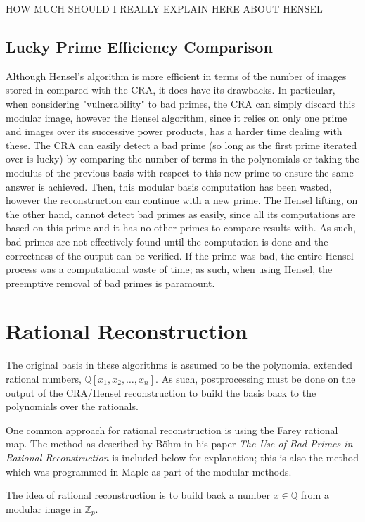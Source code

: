 \documentclass[letterpaper,12pt,titlepage,oneside,final]{book}
\begin{document}
HOW MUCH SHOULD I REALLY EXPLAIN HERE ABOUT HENSEL  

\subsection{Lucky Prime Efficiency Comparison}

Although Hensel's algorithm is more efficient in terms of the number of images stored in compared with the CRA, it does have its drawbacks.  In particular, when considering "vulnerability" to bad primes, the CRA can simply discard this modular image, however the Hensel algorithm, since it relies on only one prime and images over its successive power products, has a harder time dealing with these.  The CRA can easily detect a bad prime (so long as the first prime iterated over is lucky) by comparing the number of terms in the polynomials or taking the modulus of the previous basis with respect to this new prime to ensure the same answer is achieved.  Then, this modular basis computation has been wasted, however the reconstruction can continue with a new prime.  The Hensel lifting, on the other hand, cannot detect bad primes as easily, since all its computations are based on this prime and it has no other primes to compare results with.  As such, bad primes are not effectively found until the computation is done and the correctness of the output can be verified.  If the prime was bad, the entire Hensel process was a computational waste of time; as such, when using Hensel, the preemptive removal of bad primes is paramount.

\section{Rational Reconstruction}

The original basis in these algorithms is assumed to be the polynomial extended rational numbers, ${\mathbb{Q}[x_1, x_2, \ldots, x_n]}$.  As such, postprocessing must be done on the output of the CRA/Hensel reconstruction to build the basis back to the polynomials over the rationals.  

One common approach for rational reconstruction is using the Farey rational map.  The method as described by B\"ohm in his paper \textit{The Use of Bad Primes in Rational Reconstruction} is included below for explanation; this is also the method which was programmed in Maple as part of the modular methods.

The idea of rational reconstruction is to build back a number ${x \in \mathbb{Q}}$ from a modular image in ${\mathbb{Z}_p}$. 
\end{document}
